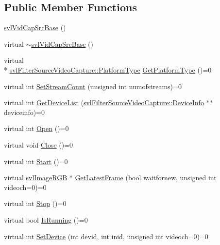 \subsection*{Public Member Functions}
\begin{DoxyCompactItemize}
\item 
\hyperlink{classsvl_vid_cap_src_base_ab8cc8201078038fd5f5313c05f87dcac}{svl\-Vid\-Cap\-Src\-Base} ()
\item 
virtual \hyperlink{classsvl_vid_cap_src_base_a77cc24bcfb46dff52df9f6d2dd1d90b9}{$\sim$svl\-Vid\-Cap\-Src\-Base} ()
\item 
virtual \\*
\hyperlink{namespacesvl_filter_source_video_capture_types_aa8ef2b6d9a414a8970cc722eaa37b32b}{svl\-Filter\-Source\-Video\-Capture\-::\-Platform\-Type} \hyperlink{classsvl_vid_cap_src_base_a68051fa2425450d680972590ca46d3fc}{Get\-Platform\-Type} ()=0
\item 
virtual int \hyperlink{classsvl_vid_cap_src_base_ae404263240c88e7752f5951b3e7a0ec3}{Set\-Stream\-Count} (unsigned int numofstreams)=0
\item 
virtual int \hyperlink{classsvl_vid_cap_src_base_ada28da77dd5c4a52f018b0499a07f8cb}{Get\-Device\-List} (\hyperlink{classsvl_filter_source_video_capture_ad656487fb2deec890dc39764152b8f8b}{svl\-Filter\-Source\-Video\-Capture\-::\-Device\-Info} $\ast$$\ast$deviceinfo)=0
\item 
virtual int \hyperlink{classsvl_vid_cap_src_base_a2855a57b3e6bb2be4a1020600fb76b4b}{Open} ()=0
\item 
virtual void \hyperlink{classsvl_vid_cap_src_base_a7a3a449ce94eee9ebe05111bb98dea2b}{Close} ()=0
\item 
virtual int \hyperlink{classsvl_vid_cap_src_base_a591d834d9e9667140032244038419080}{Start} ()=0
\item 
virtual \hyperlink{svl_types_8h_a7b03c3d61bbbbf8fe59585453969d250}{svl\-Image\-R\-G\-B} $\ast$ \hyperlink{classsvl_vid_cap_src_base_a262ea84a6bd1dfda77e41a1e04525fc8}{Get\-Latest\-Frame} (bool waitfornew, unsigned int videoch=0)=0
\item 
virtual int \hyperlink{classsvl_vid_cap_src_base_a8991f55335b8fb8aaf8a20ed28435a86}{Stop} ()=0
\item 
virtual bool \hyperlink{classsvl_vid_cap_src_base_a5ffea8235203732a10dadacf8feb5a4d}{Is\-Running} ()=0
\item 
virtual int \hyperlink{classsvl_vid_cap_src_base_a140b325929146f88f394e5c5dc6b11bf}{Set\-Device} (int devid, int inid, unsigned int videoch=0)=0
$$
\end{DoxyCompactItemize}
